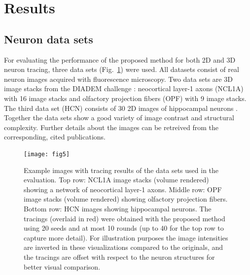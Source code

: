 \section{Results}
\label{ch3:sec:results}
\subsection{Neuron data sets} 
\label{ch3:subsec:neuron-datasets}
For evaluating the performance of the proposed method for both 2D and 3D neuron tracing, three data sets (Fig.~\ref{ch3_fig5}) were used. All datasets consist of real neuron images acquired with fluorescence microscopy. Two data sets are 3D image stacks from the DIADEM challenge \cite{brown2011diadem}: neocortical layer-1 axons (NCL1A) with 16 image stacks and olfactory projection fibers (OPF) with 9 image stacks. The third data set (HCN) consists of 30 2D images of hippocampal neurons \cite{steiner2002overexpression}. Together the data sets show a good variety of image contrast and structural complexity. Further details about the images can be retreived from the corresponding, cited publications.
\begin{figure}
	\centering
	\texttt{[image: fig5]}
	\caption{Example images with tracing results of the data sets used in the evaluation. Top row: NCL1A image stacks (volume rendered) showing a network of neocortical layer-1 axons. Middle row: OPF image stacks (volume rendered) showing olfactory projection fibers. Bottom row: HCN images showing hippocampal neurons. The tracings (overlaid in red) were obtained with the proposed method using 20 seeds and at most 10 rounds (up to 40 for the top row to capture more detail). For illustration purposes the image intensities are inverted in these visualizations compared to the originals, and the tracings are offset with respect to the neuron structures for better visual comparison.}
	\label{ch3_fig5}
\end{figure}
